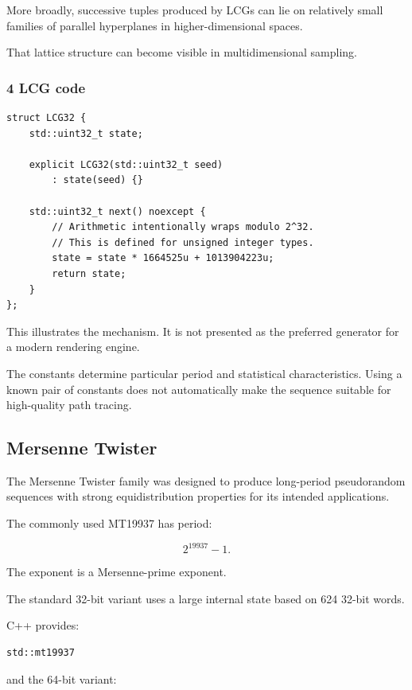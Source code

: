 More broadly, successive tuples produced by LCGs can lie on relatively small families of parallel hyperplanes in higher-dimensional spaces.

That lattice structure can become visible in multidimensional sampling.

\subsubsection{4 LCG code}\label{02-foundations-ii-ch029-lcg-code}

\begin{verbatim}
struct LCG32 {
    std::uint32_t state;

    explicit LCG32(std::uint32_t seed)
        : state(seed) {}

    std::uint32_t next() noexcept {
        // Arithmetic intentionally wraps modulo 2^32.
        // This is defined for unsigned integer types.
        state = state * 1664525u + 1013904223u;
        return state;
    }
};
\end{verbatim}

This illustrates the mechanism. It is not presented as the preferred generator for a modern rendering engine.

The constants determine particular period and statistical characteristics. Using a known pair of constants does not automatically make the sequence suitable for high-quality path tracing.

\subsection{Mersenne Twister}\label{02-foundations-ii-ch029-mersenne-twister}

The Mersenne Twister family was designed to produce long-period pseudorandom sequences with strong equidistribution properties for its intended applications.

The commonly used MT19937 has period:

\[
 \boxed{2^{19937}-1}.
\]

The exponent is a Mersenne-prime exponent.

The standard 32-bit variant uses a large internal state based on 624 32-bit words.

C++ provides:

\begin{verbatim}
std::mt19937
\end{verbatim}

and the 64-bit variant:

